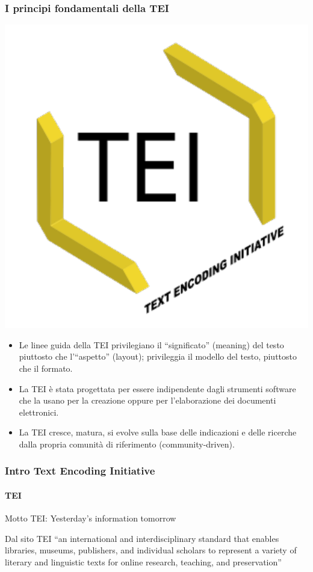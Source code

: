 \begin{frame}
	\frametitle{I principi fondamentali della TEI}
	\addtocounter{nframe}{1}
    
    \begin{center}
	    \includegraphics[width=.2\textwidth]{imgs/tei-r.pdf}
	\end{center}

    \begin{itemize}
        
        \item<1-> Le linee guida della TEI privilegiano il ``significato'' (meaning) del testo piuttosto che l'``aspetto'' (layout); privileggia il modello del testo, piuttosto che il formato.
          
        \item<2-> La TEI è stata progettata per essere indipendente dagli strumenti software che la usano per la creazione oppure per l'elaborazione dei documenti elettronici.

        \item<3-> La TEI cresce, matura, si evolve sulla base delle indicazioni e delle ricerche dalla propria comunità di riferimento (community-driven).
           
    \end{itemize}
    
\end{frame}



\begin{frame}
	\frametitle{Intro Text Encoding Initiative}
	\framesubtitle{TEI}
	\addtocounter{nframe}{1}

	\begin{block}{Motto}
		TEI: Yesterday's information tomorrow
	\end{block}

	\begin{block}{Dal sito TEI}
		“an international and interdisciplinary standard that
		enables libraries, museums, publishers, and individual
		scholars to represent a variety of literary and linguistic
		texts for online research, teaching, and preservation”
	\end{block}
\end{frame}


